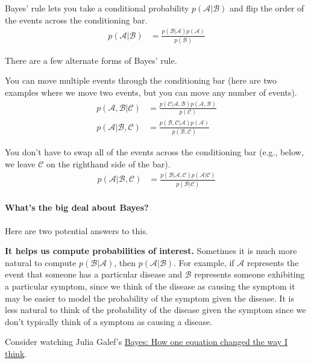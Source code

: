\documentclass{tufte-handout}
\begin{document}
Bayes' rule lets you take a conditional probability $p(\mathcal{A}|\mathcal{B})$ and flip the order of the events across the conditioning bar.
\begin{align}
p(\mathcal{A}|\mathcal{B}) &= \frac{p(\mathcal{B}|\mathcal{A}) p(\mathcal{A})}{p(\mathcal{B})}
\end{align}

There are a few alternate forms of Bayes' rule.
\bi
\item You can move multiple events through the conditioning bar (here are two examples where we move two events, but you can move any number of events).
\begin{align}
p(\mathcal{A}, \mathcal{B} | \mathcal{C}) &= \frac{p(\mathcal{C}|\mathcal{A}, \mathcal{B}) p(\mathcal{A}, \mathcal{B})}{p(\mathcal{C})} \\
p(\mathcal{A} |  \mathcal{B}, \mathcal{C}) &= \frac{p(\mathcal{B}, \mathcal{C}|\mathcal{A}) p(\mathcal{A})}{p(\mathcal{B}, \mathcal{C})}
\end{align}
\item You don't have to swap all of the events across the conditioning bar (e.g., below, we leave $\mathcal{C}$ on the righthand side of the bar).
\begin{align}
p(\mathcal{A}|\mathcal{B},\mathcal{C}) &= \frac{p(\mathcal{B} | \mathcal{A}, \mathcal{C}) p(\mathcal{A}|\mathcal{C})}{p(\mathcal{B}|\mathcal{C})}
\end{align}
\ei


\paragraph{What's the big deal about Bayes?}
Here are two potential answers to this.
\bi
\item \textbf{It helps us compute probabilities of interest.}  Sometimes it is much more natural to compute $p(\mathcal{B} | \mathcal{A})$, then $p(\mathcal{A} | \mathcal{B})$.  For example, if $\mathcal{A}$ represents the event that someone has a particular disease and $\mathcal{B}$ represents someone exhibiting a particular symptom, since we think of the disease as causing the symptom it may be easier to model the probability of the symptom given the disease.  It is less natural to think of the probability of the disease given the symptom since we don't typically think of a symptom as causing a disease.
\item Consider watching Julia Galef's \href{https://www.youtube.com/watch?v=za7RqnT7CM0}{Bayes: How one equation changed the way I think}.
\ei
\end{document}
